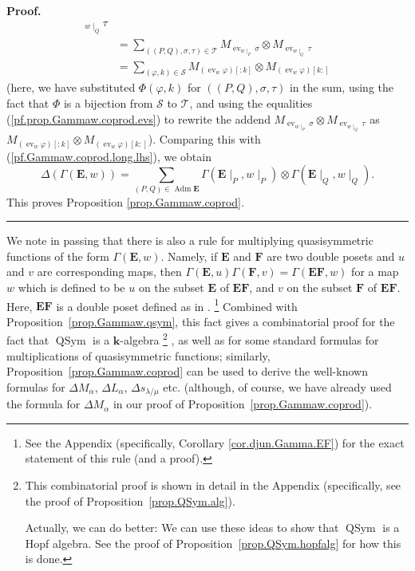 \documentclass[numbers=enddot,12pt,final,onecolumn,notitlepage,abstracton]{scrartcl}
\theoremstyle{definition}
\newenvironment{proof}[1][Proof]{\noindent\textbf{#1.} }{\ \rule{0.5em}{0.5em}}
\let\sumnonlimits\sum
\renewcommand{\sum}{\sumnonlimits\limits}
\newenvironment{verlong}{}{}
\newcommand{\kk}{{\mathbf{k}}}
\newcommand{\Adm}{\operatorname{Adm}}
\newcommand{\QSym}{{\operatorname{QSym}}}
\newcommand{\EE}{{\mathbf{E}}}
\newcommand{\FF}{{\mathbf{F}}}
\begin{document}
\begin{verlong}
\begin{proof}
\begin{align*}
{_{w\mid_{Q}}\tau}\\
&  =\sum_{\left(  \left(  P,Q\right)  ,\sigma,\tau\right)  \in\mathcal{T}%
}M_{\operatorname{ev}_{w\mid_{P}}\sigma}\otimes M_{\operatorname{ev}%
_{w\mid_{Q}}\tau}\\
&  =\sum_{\left(  \varphi,k\right)  \in\mathcal{S}}M_{\left(
\operatorname{ev}_{w}\varphi\right)  \left[  :k\right]  }\otimes M_{\left(
\operatorname{ev}_{w}\varphi\right)  \left[  k:\right]  }%
\end{align*}
(here, we have substituted $\Phi\left(  \varphi,k\right)  $ for $\left(
\left(  P,Q\right)  ,\sigma,\tau\right)  $ in the sum, using the fact that
$\Phi$ is a bijection from $\mathcal{S}$ to $\mathcal{T}$, and using the
equalities (\ref{pf.prop.Gammaw.coprod.evs}) to rewrite the addend
$M_{\operatorname{ev}_{w\mid_{P}}\sigma}\otimes M_{\operatorname{ev}%
_{w\mid_{Q}}\tau}$ as $M_{\left(  \operatorname{ev}_{w}\varphi\right)  \left[
:k\right]  }\otimes M_{\left(  \operatorname{ev}_{w}\varphi\right)  \left[
k:\right]  }$). Comparing this with (\ref{pf.Gammaw.coprod.long.lhs}), we
obtain%
\[
\Delta\left(  \Gamma\left(   \EE ,w\right)  \right)  =\sum_{\left(
P,Q\right)  \in \Adm \EE }\Gamma\left(   \EE %
\mid_{P},w\mid_{P}\right)  \otimes\Gamma\left(   \EE \mid_{Q},w\mid
_{Q}\right)  .
\]
This proves Proposition \ref{prop.Gammaw.coprod}.
\end{proof}
\end{verlong}

We note in passing that there is also a rule for multiplying
quasisymmetric functions of the form $\Gamma\left(\EE, w\right)$.
Namely, if $\EE$ and $\FF$ are two double posets and $u$ and $v$
are corresponding maps, then $\Gamma\left(\EE, u\right)
\Gamma\left(\FF, v\right) = \Gamma\left(\EE \FF, w\right)$ for a
map $w$ which is defined to be $u$ on the subset $\EE$ of
$\EE \FF$, and $v$ on the subset $\FF$ of $\EE \FF$. Here, $\EE \FF$
is a double poset defined as in \cite[\S 2.1]{Mal-Reu-DP}.
\begin{verlong}
\footnote{See the Appendix
(specifically, Corollary \ref{cor.djun.Gamma.EF}) for the exact
statement of this rule (and a proof).}
\end{verlong}
Combined with Proposition~\ref{prop.Gammaw.qsym}, this fact gives
a combinatorial proof for the fact that $\QSym$ is a $\kk$-algebra%
\begin{verlong}
\footnote{This combinatorial proof is shown in detail in the Appendix
(specifically, see the proof of Proposition~\ref{prop.QSym.alg}).
\par
Actually, we can do better: We can use these ideas to show that
$\QSym$ is a Hopf algebra.
See the proof of Proposition~\ref{prop.QSym.hopfalg} for how this
is done.}%
\end{verlong}
,
as well as for some standard formulas for multiplications of
quasisymmetric functions; similarly,
Proposition~\ref{prop.Gammaw.coprod} can be used to derive the
well-known formulas for $\Delta M_\alpha$, $\Delta L_\alpha$,
$\Delta s_{\lambda / \mu}$ etc. (although, of course, we have
already used the formula for $\Delta M_\alpha$ in our proof of
Proposition~\ref{prop.Gammaw.coprod}).
\end{document}
